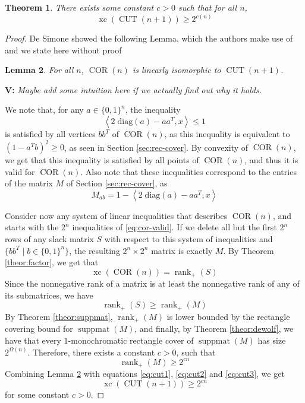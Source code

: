 \documentclass{article}
\newtheorem{theorem}{\sc Theorem}
\newtheorem{lemma}[theorem]{\sc Lemma}
\theoremstyle{definition}
\theoremstyle{remark}
\newcommand{\nrank}{\operatorname{rank}_+}
\newcommand{\suppmat}{\operatorname{suppmat}}
\newcommand{\xc}{\operatorname{xc}}
\newcommand{\CUT}{\operatorname{CUT}}
\newcommand{\COR}{\operatorname{COR}}
\newcommand{\vnote}[1]{{\color{magenta}\noindent\textbf{V: }\marginpar{****}\textit{{#1}}}}
\begin{document}
\begin{theorem}\label{theor:cut}
There exists some constant $c > 0$ such that for all $n$,
\[
\xc(\CUT(n+1)) \geq 2^{c(n)}
\]
\end{theorem}
\begin{proof}
De Simone \cite{de-simone} showed the following Lemma, which the authors make use of and we state here without proof

\begin{lemma}\label{lem:cut-cor}
For all $n$, $\COR(n)$ is linearly isomorphic to $\CUT(n+1)$.
\end{lemma}

\vnote{Maybe add some intuition here if we actually find out why it holds.}

We note that, for any $a \in {\{0, 1\}}^n$, the inequality
\begin{equation}\label{eq:cor-valid}
\left\langle 2 \; \text{diag}(a) - aa^T, x \right\rangle \leq 1
\end{equation}
is satisfied by all vertices $bb^T$ of $\COR(n)$, as this inequality is equivalent to ${(1 - a^Tb)}^2 \geq 0$, as seen in Section \ref{sec:rec-cover}. By convexity of $\COR(n)$, we get that this inequality is satisfied by all points of $\COR(n)$, and thus it is valid for $\COR(n)$. Also note that these inequalities correspond to the entries of the matrix $M$ of Section \ref{sec:rec-cover}, as
\[
M_{ab} = 1 - \left\langle 2 \; \text{diag}(a) - aa^T, x \right\rangle
\]

Consider now any system of linear inequalities that describes $\COR(n)$, and starts with the $2^n$ inequalities of \eqref{eq:cor-valid}. If we delete all but the first $2^n$ rows of any slack matrix $S$ with respect to this system of inequalities and $\{bb^T \mid b \in {\{0, 1\}}^n \}$, the resulting $2^n \times 2^n$ matrix is exactly $M$. By Theorem \ref{theor:factor}, we get that
\begin{equation}\label{eq:cut1}
\xc(\COR(n)) = \nrank(S)
\end{equation}
Since the nonnegative rank of a matrix is at least the nonnegative rank of any of its submatrices, we have
\begin{equation}\label{eq:cut2}
\nrank(S) \geq \nrank(M)
\end{equation}
By Theorem \ref{theor:suppmat}, $\nrank(M)$ is lower bounded by the rectangle covering bound for $\suppmat(M)$, and finally, by Theorem \ref{theor:dewolf}, we have that every $1$-monochromatic rectangle cover of $\suppmat(M)$ has size $2^{\Omega(n)}$. Therefore, there exists a constant $c > 0$, such that
\begin{equation}\label{eq:cut3}
\nrank(M) \geq 2^{cn}
\end{equation}
Combining Lemma \ref{lem:cut-cor} with equations \eqref{eq:cut1}, \eqref{eq:cut2} and \eqref{eq:cut3}, we get
\[
\xc(\CUT(n+1)) \geq 2^{cn}
\]
for some constant $c > 0$.
\end{proof}
\end{document}
